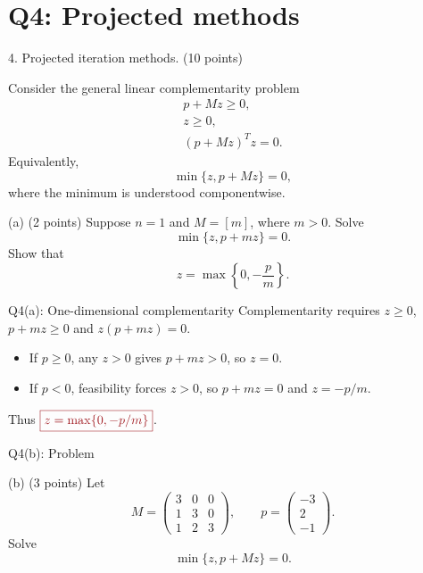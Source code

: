 \documentclass{beamer}
\newcommand{\keymath}[1]{\textcolor{lecturekey}{#1}}
\newcommand{\keybox}[1]{\keymath{\boxed{#1}}}
\begin{document}
\section{Q4: Projected methods}

\begin{frame}{4. Projected iteration methods.}
\footnotesize
\setlength{\abovedisplayskip}{5pt}
\setlength{\belowdisplayskip}{5pt}
\hfill (10 points)\par
Consider the general linear complementarity problem
\begin{gather*}
p+Mz\geq0,\\
z\geq0,\\
(p+Mz)^Tz=0.
\end{gather*}
Equivalently,
\[
\min\{z,p+Mz\}=0,
\]
where the minimum is understood componentwise.
\begin{block}{(a) \hfill (2 points)}
Suppose $n=1$ and $M=[m]$, where $m>0$. Solve
\[
\min\{z,p+mz\}=0.
\]
Show that
\[
z=\max\left\{0,-\frac{p}{m}\right\}.
\]
\end{block}
\end{frame}

\begin{frame}{Q4(a): One-dimensional complementarity}
\small
Complementarity requires $z\geq0$, $p+mz\geq0$ and $z(p+mz)=0$.
\begin{itemize}
\item If $p\geq0$, any $z>0$ gives $p+mz>0$, so $z=0$.
\item If $p<0$, feasibility forces $z>0$, so $p+mz=0$ and $z=-p/m$.
\end{itemize}
Thus $\keybox{z=\max\{0,-p/m\}}$.
\end{frame}

\begin{frame}{Q4(b): Problem}
\footnotesize
\setlength{\abovedisplayskip}{5pt}
\setlength{\belowdisplayskip}{5pt}
\begin{block}{(b) \hfill (3 points)}
Let
\[
M=\begin{pmatrix}3&0&0\\1&3&0\\1&2&3\end{pmatrix},\qquad
p=\begin{pmatrix}-3\\2\\-1\end{pmatrix}.
\]
Solve
\[
\min\{z,p+Mz\}=0.
\]
\end{block}
\end{frame}
\end{document}
